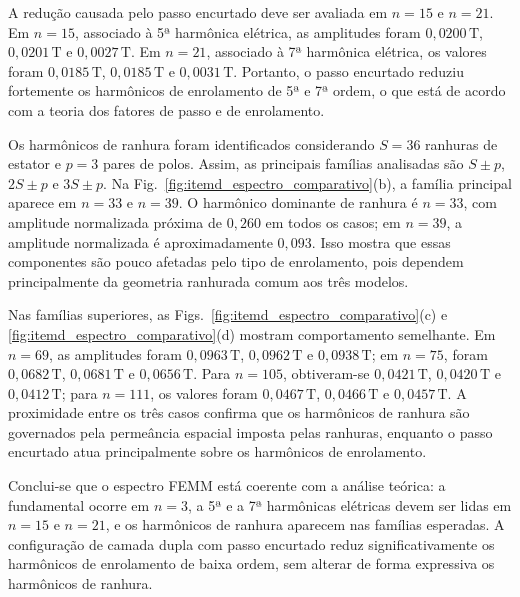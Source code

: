 A redução causada pelo passo encurtado deve ser avaliada em \(n=15\) e \(n=21\). Em \(n=15\), associado à 5ª harmônica elétrica, as amplitudes foram \(0{,}0200\,\mathrm{T}\), \(0{,}0201\,\mathrm{T}\) e \(0{,}0027\,\mathrm{T}\). Em \(n=21\), associado à 7ª harmônica elétrica, os valores foram \(0{,}0185\,\mathrm{T}\), \(0{,}0185\,\mathrm{T}\) e \(0{,}0031\,\mathrm{T}\). Portanto, o passo encurtado reduziu fortemente os harmônicos de enrolamento de 5ª e 7ª ordem, o que está de acordo com a teoria dos fatores de passo e de enrolamento.

Os harmônicos de ranhura foram identificados considerando \(S=36\) ranhuras de estator e \(p=3\) pares de polos. Assim, as principais famílias analisadas são \(S\pm p\), \(2S\pm p\) e \(3S\pm p\). Na Fig.~\ref{fig:itemd_espectro_comparativo}(b), a família principal aparece em \(n=33\) e \(n=39\). O harmônico dominante de ranhura é \(n=33\), com amplitude normalizada próxima de \(0{,}260\) em todos os casos; em \(n=39\), a amplitude normalizada é aproximadamente \(0{,}093\). Isso mostra que essas componentes são pouco afetadas pelo tipo de enrolamento, pois dependem principalmente da geometria ranhurada comum aos três modelos.

Nas famílias superiores, as Figs.~\ref{fig:itemd_espectro_comparativo}(c) e \ref{fig:itemd_espectro_comparativo}(d) mostram comportamento semelhante. Em \(n=69\), as amplitudes foram \(0{,}0963\,\mathrm{T}\), \(0{,}0962\,\mathrm{T}\) e \(0{,}0938\,\mathrm{T}\); em \(n=75\), foram \(0{,}0682\,\mathrm{T}\), \(0{,}0681\,\mathrm{T}\) e \(0{,}0656\,\mathrm{T}\). Para \(n=105\), obtiveram-se \(0{,}0421\,\mathrm{T}\), \(0{,}0420\,\mathrm{T}\) e \(0{,}0412\,\mathrm{T}\); para \(n=111\), os valores foram \(0{,}0467\,\mathrm{T}\), \(0{,}0466\,\mathrm{T}\) e \(0{,}0457\,\mathrm{T}\). A proximidade entre os três casos confirma que os harmônicos de ranhura são governados pela permeância espacial imposta pelas ranhuras, enquanto o passo encurtado atua principalmente sobre os harmônicos de enrolamento.

Conclui-se que o espectro FEMM está coerente com a análise teórica: a fundamental ocorre em \(n=3\), a 5ª e a 7ª harmônicas elétricas devem ser lidas em \(n=15\) e \(n=21\), e os harmônicos de ranhura aparecem nas famílias esperadas. A configuração de camada dupla com passo encurtado reduz significativamente os harmônicos de enrolamento de baixa ordem, sem alterar de forma expressiva os harmônicos de ranhura.
